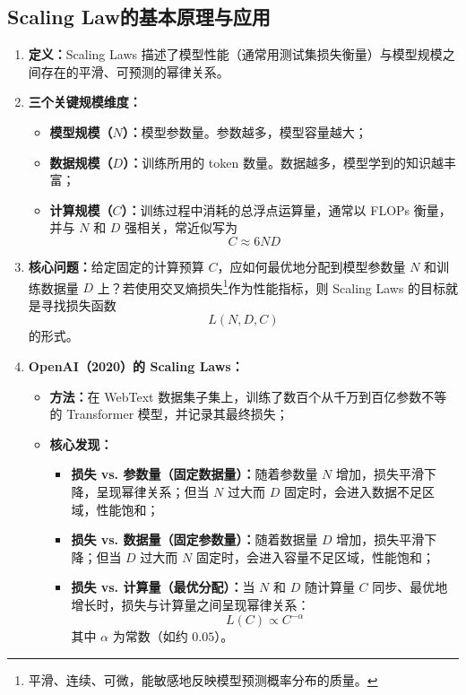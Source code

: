 \documentclass[../main.tex]{subfiles}
\begin{document}
\subsection{Scaling Law的基本原理与应用}\label{sec:scaling-law}
\begin{enumerate}
    \item \textbf{定义：}Scaling Laws 描述了模型性能（通常用测试集损失衡量）与模型规模之间存在的平滑、可预测的幂律关系。

    \item \textbf{三个关键规模维度：}
    \begin{itemize}
        \item \textbf{模型规模（$N$）：}模型参数量。参数越多，模型容量越大；
        \item \textbf{数据规模（$D$）：}训练所用的 token 数量。数据越多，模型学到的知识越丰富；
        \item \textbf{计算规模（$C$）：}训练过程中消耗的总浮点运算量，通常以 FLOPs 衡量，并与 $N$ 和 $D$ 强相关，常近似写为
        $$
        C\approx 6ND
        $$
    \end{itemize}

    \item \textbf{核心问题：}给定固定的计算预算 $C$，应如何最优地分配到模型参数量 $N$ 和训练数据量 $D$ 上？若使用交叉熵损失\footnote{平滑、连续、可微，能敏感地反映模型预测概率分布的质量。}作为性能指标，则 Scaling Laws 的目标就是寻找损失函数
    $$
    L(N,D,C)
    $$
    的形式。

    \item \textbf{OpenAI（2020）的 Scaling Laws：}
    \begin{itemize}
        \item \textbf{方法：}在 WebText 数据集子集上，训练了数百个从千万到百亿参数不等的 Transformer 模型，并记录其最终损失；
        \item \textbf{核心发现：}
        \begin{itemize}
            \item \textbf{损失 vs. 参数量（固定数据量）：}随着参数量 $N$ 增加，损失平滑下降，呈现幂律关系；但当 $N$ 过大而 $D$ 固定时，会进入数据不足区域，性能饱和；
            \item \textbf{损失 vs. 数据量（固定参数量）：}随着数据量 $D$ 增加，损失平滑下降；但当 $D$ 过大而 $N$ 固定时，会进入容量不足区域，性能饱和；
            \item \textbf{损失 vs. 计算量（最优分配）：}当 $N$ 和 $D$ 随计算量 $C$ 同步、最优地增长时，损失与计算量之间呈现幂律关系：
            $$
            L(C)\propto C^{-\alpha}
            $$
            其中 $\alpha$ 为常数（如约 $0.05$）。
        \end{itemize}
    \end{itemize}


\end{enumerate}
\end{document}
